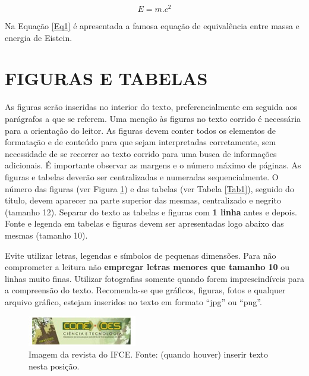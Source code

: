 \documentclass[10pt,brazil,english]{article}
\begin{document}
\begin{equation}
E=m.c^{2}
\label{Eq1}
\end{equation}

Na Equação \ref{Eq1} é apresentada a famosa equação de equivalência entre massa e energia de Eistein.

\section{\uppercase{Figuras e tabelas}}

As figuras serão inseridas no interior do texto, preferencialmente em seguida aos parágrafos a que se referem. Uma menção às figuras no texto corrido é necessária para a orientação do leitor. As figuras devem conter todos os elementos de formatação e de conteúdo para que sejam interpretadas corretamente, sem necessidade de se recorrer ao texto corrido para uma busca de informações adicionais. É importante observar as margens e o número máximo de páginas. As figuras e tabelas deverão ser centralizadas e numeradas sequencialmente. O número das figuras (ver Figura \ref{Fig1}) e das tabelas (ver Tabela \ref{Tab1}), seguido do título, devem aparecer na parte superior das mesmas, centralizado e negrito (tamanho 12). Separar do texto as tabelas e figuras com \textbf{1 linha} antes e depois. Fonte e legenda em tabelas e figuras devem ser apresentadas logo abaixo das mesmas (tamanho 10).

Evite utilizar letras, legendas e símbolos de pequenas dimensões. Para não comprometer a leitura não \textbf{empregar letras menores que tamanho 10} ou linhas muito finas. Utilizar fotografias somente quando forem imprescindíveis para a compreensão do texto. Recomenda-se que gráficos, figuras, fotos e qualquer arquivo gráfico, estejam inseridos no texto em formato ``jpg'' ou ``png''.


\begin{figure}[!hbtp]
\begin{center}

\includegraphics[scale=1]{images/figura.png}
\end{center}
\caption{Imagem da revista do IFCE. Fonte: (quando houver) inserir texto nesta posição.}
\label{Fig1}
\end{figure}
\end{document}
